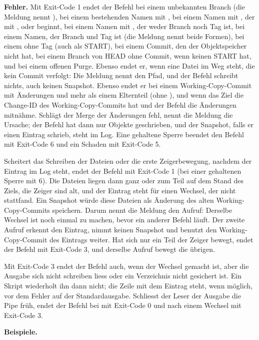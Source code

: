 {\bf Fehler.} Mit Exit-Code 1 endet der Befehl bei einem unbekannten Branch (die Meldung nennt
), bei einem bestehenden Namen mit , bei einem Namen mit ,
der mit ,  oder  beginnt,
bei einem Namen mit , der weder
Branch noch Tag ist, bei einem Namen, der Branch und Tag ist (die Meldung nennt beide Formen), bei
einem  ohne Tag (auch als START), bei einem Commit,
den der Objektspeicher nicht hat, bei einem Branch von HEAD ohne Commit,
wenn  keinen START hat, und bei einem offenen Purge.
Ebenso endet er, wenn eine Datei im Weg steht, die kein Commit verfolgt: Die Meldung nennt den Pfad,
und der Befehl schreibt nichts, auch keinen Snapshot.
Ebenso endet er bei einem Working-Copy-Commit mit Änderungen und mehr als einem Elternteil
(ohne ), und wenn das Ziel die Change-ID des Working-Copy-Commits hat und
der Befehl die Änderungen mitnähme.
Schlägt der Merge der Änderungen fehl, nennt die Meldung die Ursache; der Befehl hat dann nur
Objekte geschrieben, und der Snapshot, falls er einen Eintrag schrieb, steht im Log.
Eine gehaltene Sperre beendet den Befehl mit Exit-Code 6 und ein Schaden mit Exit-Code 5.

Scheitert das Schreiben der Dateien oder die erste Zeigerbewegung, nachdem der Eintrag im Log
steht, endet der Befehl mit Exit-Code 1 (bei einer gehaltenen Sperre mit 6).
Die Dateien liegen dann ganz oder zum Teil auf dem Stand des Ziels, die Zeiger sind alt,
und der Eintrag steht für einen Wechsel, der nicht stattfand.
Ein Snapshot würde diese Dateien als Änderung des alten Working-Copy-Commits speichern.
Darum nennt die Meldung den Aufruf: Derselbe Wechsel ist noch einmal zu machen, bevor ein
anderer Befehl läuft. Der zweite Aufruf erkennt den Eintrag, nimmt keinen Snapshot und
benutzt den Working-Copy-Commit des Eintrags weiter.
Hat sich nur ein Teil der Zeiger bewegt, endet der Befehl mit Exit-Code 3, und derselbe
Aufruf bewegt die übrigen.

Mit Exit-Code 3 endet der Befehl auch, wenn der Wechsel gemacht ist,
aber die Ausgabe sich nicht schreiben liess oder ein Verzeichnis nicht gesichert ist.
Ein Skript wiederholt ihn dann nicht; die Zeile mit dem Eintrag steht, wenn möglich, vor dem
Fehler auf der Standardausgabe. Schliesst der Leser der Ausgabe die Pipe früh,
endet der Befehl bei  mit Exit-Code 0 und nach einem Wechsel mit Exit-Code 3.

{\bf Beispiele.}

